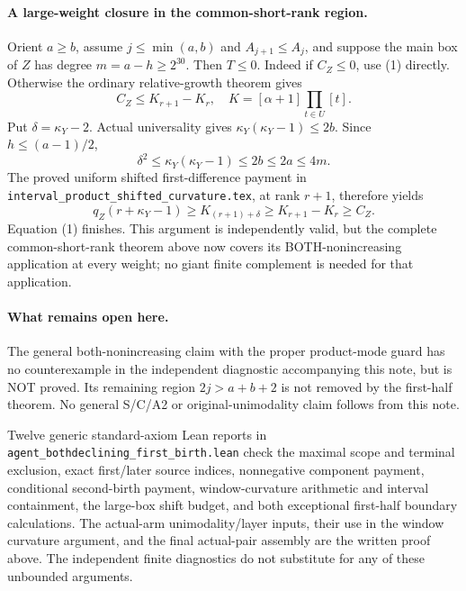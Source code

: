 \paragraph{A large-weight closure in the common-short-rank region.}
Orient $a\ge b$, assume $j\le\min(a,b)$ and $A_{j+1}\le A_j$,
and suppose the main box of $Z$ has degree $m=a-h\ge2^{30}$.
Then $T\le0$. Indeed if $C_Z\le0$, use (1) directly.
Otherwise the ordinary relative-growth theorem gives
\[
 C_Z\le K_{r+1}-K_r,
 \quad K=[\alpha+1]\prod_{t\in U}[t].
\]
Put $\delta=\kappa_Y-2$. Actual universality gives
$\kappa_Y(\kappa_Y-1)\le2b$. Since $h\le(a-1)/2$,
\[
 \delta^2\le\kappa_Y(\kappa_Y-1)\le2b\le2a\le4m.
\]
The proved uniform shifted first-difference payment in
\texttt{interval\_product\_shifted\_curvature.tex}, at rank $r+1$,
therefore yields
\[
 q_Z(r+\kappa_Y-1)\ge K_{(r+1)+\delta}
           \ge K_{r+1}-K_r\ge C_Z.
\]
Equation (1) finishes. This argument is independently valid,
but the complete common-short-rank theorem above now covers its
BOTH-nonincreasing application at every weight; no giant finite
complement is needed for that application.

\paragraph{What remains open here.}
The general both-nonincreasing claim with the proper product-mode guard
has no counterexample in the independent diagnostic accompanying this
note, but is NOT proved. Its remaining region $2j>a+b+2$ is
not removed by the first-half theorem. No general S/C/A2 or
original-unimodality claim follows from this note.

Twelve generic standard-axiom Lean reports in
\texttt{agent\_bothdeclining\_first\_birth.lean} check the maximal
scope and terminal exclusion, exact first/later source indices,
nonnegative component payment, conditional second-birth payment,
window-curvature arithmetic and interval containment, the large-box
shift budget, and both exceptional first-half boundary calculations.
The actual-arm unimodality/layer inputs, their use in the window
curvature argument, and the final actual-pair assembly are the written
proof above. The independent finite diagnostics do not substitute
for any of these unbounded arguments.
